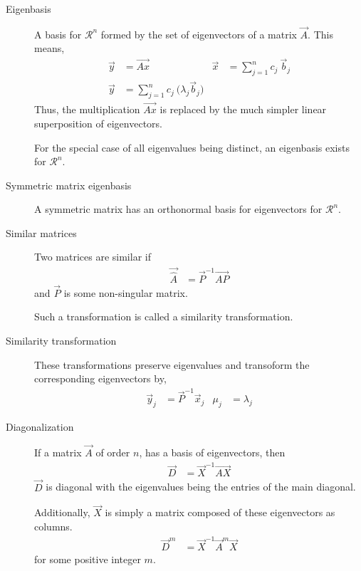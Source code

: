 \begin{description}
    \item[Eigenbasis] A basis for $ \mathcal{R}^n $ formed by the set of eigenvectors of
        a matrix $ \vec{A} $. This means,
        \begin{align}
            \vec{y} & = \vec{Ax}                                            &
            \vec{x} & = \sum_{j=1}^{n} c_j\ \vec{b}_j                         \\
            \vec{y} & = \sum_{j=1}^{n} c_j\ \Big( \lambda_j \vec{b}_j \Big)
        \end{align}
        Thus, the multiplication $ \vec{Ax} $ is replaced by the much simpler linear
        superposition of eigenvectors. \par

        For the special case of all eigenvalues being distinct, an eigenbasis exists
        for $ \mathcal{R}^n $. \par

    \item[Symmetric matrix eigenbasis] A symmetric matrix has an orthonormal basis
        for eigenvectors for $ \mathcal{R}^n $.

    \item[Similar matrices] Two matrices are similar if
        \begin{align}
            \vec{\hat{A}} & = \vec{P}^{-1}\vec{AP}
        \end{align}
        and $ \vec{P} $ is some non-singular matrix. \par
        Such a transformation is called a similarity transformation.

    \item[Similarity transformation] These transformations preserve eigenvalues and
        transoform the corresponding eigenvectors by,
        \begin{align}
            \vec{y}_j & = \vec{P}^{-1}\vec{x}_j &
            \mu_j     & = \lambda_j
        \end{align}

    \item[Diagonalization] If a matrix $ \vec{A} $ of order $ n $, has a basis of
        eigenvectors, then
        \begin{align}
            \vec{D} & = \vec{X}^{-1}\vec{AX}
        \end{align}
        $ \vec{D} $ is diagonal with the eigenvalues being the entries of the main
        diagonal. \par
        Additionally, $ \vec{X} $ is simply a matrix composed of these eigenvectors as
        columns.
        \begin{align}
            \vec{D}^m & = \vec{X}^{-1}\vec{A}^m \vec{X}
        \end{align}
        for some positive integer $ m $.


\end{description}
